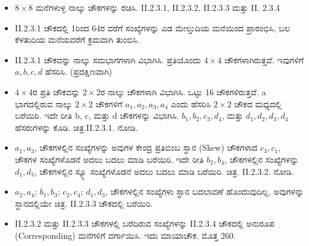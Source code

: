 \begin{itemize}
	\item $8 \times 8$ ಮನೆಗಳುಳ್ಳ ನಾಲ್ಕು ಚೌಕಗಳನ್ನು ರಚಿಸಿ. II.2.3.1, II.2.3.2, II.2.3.3 ಮತ್ತು II. 2.3.4\smallskip
	\item II.2.3.1 ಚೌಕದಲ್ಲಿ 1ರಿಂದ 64ರ ವರೆಗೆ ಸಂಖ್ಯೆಗಳನ್ನು ಎಡ ಮೇಲ್ತುದಿಯ ಮನೆಯಿಂದ ಪ್ರಾರಂಭಿಸಿ, ಬಲ ಕೆಳತುದಿಯ ಮನೆಯವರೆಗೆ ಕ್ರಮವಾಗಿ ತುಂಬಿಸಿ.\smallskip
	\item II.2.3.1 ಚೌಕವನ್ನು ನಾಲ್ಕು ಸಮಭಾಗಗಳಾಗಿ ವಿಭಾಗಿಸಿ. ಪ್ರತಿಯೊಂದು $4 \times 4$ ಚೌಕಗಳಾಗಿರುತ್ತವೆ. ಇವುಗಳಿಗೆ $a, b, c, d$ ಹೆಸರಿಸಿ. (ಪ್ರದಕ್ಷಿಣವಾಗಿ)\smallskip
	\item $4 \times 4$ರ ಪ್ರತಿ ಚೌಕವನ್ನು $2 \times 2$ರ ನಾಲ್ಕು ಚೌಕಗಳಾಗಿ ವಿಭಾಗಿಸಿ. ಒಟ್ಟು 16 ಚೌಕಗಳಿರುತ್ತವೆ. a ಭಾಗದಲ್ಲಿರುವ ನಾಲ್ಕು $2 \times 2$ ಚೌಕಗಳಿಗೆ $a_1, a_2, a_3, a_4$ ಎಂದು ಹೆಸರಿಸಿ $2 \times 2$ ಚೌಕದ ಮಧ್ಯದಲ್ಲಿ ಬರೆಯಿರಿ. ಇದೇ ರೀತಿ b, c, ಮತ್ತು d ಚೌಕಗಳನ್ನು ವಿಭಾಗಿಸಿ. $b_1, b_2, c_3, d_4$, ಮತ್ತು $d_1, d_2, d_3, d_4$ ಹೆಸರುಗಳನ್ನು ಕೊಡಿ. ಚಿತ್ರ.II.2.3.1. ನೋಡಿ.
	\item $a_1, a_3$, ಚೌಕಗಳಲ್ಲಿನ ಸಂಖ್ಯೆಗಳನ್ನು ಅವುಗಳ ಕೇಂದ್ರ ಪ್ರತಿಬಿಂಬ ಸ್ಥಾನ (Skew) ಚೌಕಗಳಾದ $c_3, c_1$, ಚೌಕಗಳ ಸಂಖ್ಯೆಗಳೊಡನೆ ಅದಲು ಬದಲು ಮಾಡಿ ಬರೆ\-ಯಿರಿ. ಇದೇ ರೀತಿ $b_2, b_4$, ಚೌಕಗಳಲ್ಲಿನ ಸಂಖ್ಯೆಗಳನ್ನು $d_1, d_3$, ಚೌಕಗಳಲ್ಲಿನ ಸ್ಕ್ಯೂ  ಸಂಖ್ಯೆ\-ಗಳೊಡನೆ ಅದಲು ಬದಲು ಮಾಡಿ ಬರೆಯಿರಿ. ಚಿತ್ರ. II.2.3.2. ನೋಡಿ.\medskip
	\item $a_2, a_4$; $b_1, b_3$; $c_2, c_4$; $d_1, d_3$, ಚೌಕಗಳಲ್ಲಿನ ಸಂಖ್ಯೆಗಳು ಸ್ಥಾನ ಬದ\-ಲಾವಣೆ ಹೊಂದುವುದಿಲ್ಲ. ಅವುಗಳನ್ನು ಸ್ಥಾನದಲ್ಲಿಯೇ ಚಿತ್ರ. II.2.3.3 ಚೌಕದಲ್ಲಿ \hbox{ಬರೆಯಿರಿ.}\medskip
	\item II.2.3.2 ಮತ್ತು II.2.3.3 ಚೌಕಗಳಲ್ಲಿ ಬರೆದಿರುವ ಸಂಖ್ಯೆಗಳನ್ನು II.2.3.4 ಚೌಕದಲ್ಲಿ ಅನುರೂಪ (Corresponding) ಮನೆಗಳಿಗೆ ವರ್ಗಾಯಿಸಿ. ಇದು ಮಾಯಾಚೌಕ. ಮೊತ್ತ 260.
\end{itemize}

